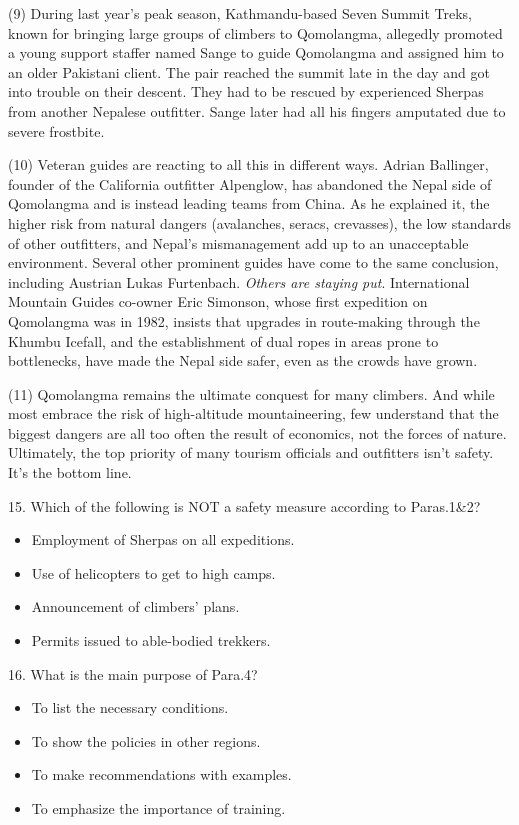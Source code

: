 \documentclass[UTF8,11pt]{ctexart}
\begin{document}
(9) During last year’s peak season, Kathmandu-based Seven Summit Treks, known for bringing large groups of climbers to Qomolangma, allegedly promoted a young support staffer named Sange to guide Qomolangma and assigned him to an older Pakistani client. The pair reached the summit late in the day and got into trouble on their descent. They had to be rescued by experienced Sherpas from another Nepalese outfitter. Sange later had all his fingers amputated due to severe frostbite.


(10) Veteran guides are reacting to all this in different ways. Adrian Ballinger, founder of the California outfitter Alpenglow, has abandoned the Nepal side of Qomolangma and is instead leading teams from China. As he explained it, the higher risk from natural dangers (avalanches, seracs, crevasses), the low standards of other outfitters, and Nepal’s mismanagement add up to an unacceptable environment. Several other prominent guides have come to the same conclusion, including Austrian Lukas Furtenbach. \textit{Others are staying put}. International Mountain Guides co-owner Eric Simonson, whose first expedition on Qomolangma was in 1982, insists that upgrades in route-making through the Khumbu Icefall, and the establishment of dual ropes in areas prone to bottlenecks, have made the Nepal side safer, even as the crowds have grown.


(11) Qomolangma remains the ultimate conquest for many climbers. And while most embrace the risk of high-altitude mountaineering, few understand that the biggest dangers are all too often the result of economics, not the forces of nature. Ultimately, the top priority of many tourism officials and outfitters isn’t safety. It’s the bottom line.


15. Which of the following is NOT a safety measure according to Paras.1\&2?


\begin{itemize}[leftmargin=2em,itemsep=.2em,topsep=.4em]\item[A.] Employment of Sherpas on all expeditions.
\item[B.] Use of helicopters to get to high camps.
\item[C.] Announcement of climbers’ plans.
\item[D.] Permits issued to able-bodied trekkers.
\end{itemize}

16. What is the main purpose of Para.4?


\begin{itemize}[leftmargin=2em,itemsep=.2em,topsep=.4em]\item[A.] To list the necessary conditions.
\item[B.] To show the policies in other regions.
\item[C.] To make recommendations with examples.
\item[D.] To emphasize the importance of training.
\end{itemize}
\end{document}
